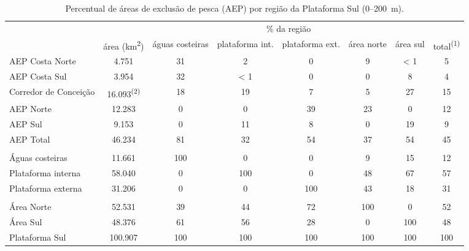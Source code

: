 \documentclass[a4paper,11pt,twoside,showtrims,onecolumn,openright,final]{memoir}
\begin{document}

\begin{table}
\caption{Percentual de áreas de exclusão de pesca (AEP) por região da Plataforma Sul (0--200~m).}
\label{tab:areas-aep}
\begin{tabularx}{\textheight}{Xccccccc}
\toprule
				&				& \multicolumn{5}{c}{\% da região} 						&	\\
\cmidrule(lr){3-7}
				& área (km\textsuperscript{2})	& águas costeiras & plataforma int.     & plataforma ext. 	& área norte	& área sul	& total\textsuperscript{(1)}	\\
\midrule
AEP Costa Norte			& 4.751				& 31		  &	2	       &	0		& 	9	& 	< 1	&  5	\\
AEP Costa Sul			& 3.954				& 32		  &	< 1	       &	0		& 	0	& 	8	&  4	\\
Corredor de Conceição		& 16.093\textsuperscript{(2)}	& 18		  &	19	       &	7		& 	5	& 	27	&  15	\\
AEP Norte 			& 12.283			& 0		  &	0	       &	39		& 	23	& 	0	&  12	\\
AEP Sul 			& 9.153				& 0		  &	11	       &	8		& 	0	& 	19	&  9	\\
\addlinespace
AEP Total			& 46.234			& 81		  &	32	       &	54		& 	37	& 	54	&  45	\\
\midrule
				&				&		  &		       &			&		&		&  	\\
Águas costeiras			& 11.661			& 100		  &	0	       &	0		& 	9	& 	15	&  12	\\
Plataforma interna		& 58.040			& 0		  &	100	       &	0		& 	48	& 	67	&  57	\\
Plataforma externa		& 31.206			& 0		  &	0	       &	100		& 	43	& 	18	&  31	\\
\midrule
				& 				& 		  &		       &			& 		& 		&  	\\
Área Norte			& 52.531			& 39		  &	44	       &	72		& 	100	& 	0	&  52	\\
Área Sul			& 48.376			& 61		  &	56	       &	28		& 	0	& 	100	&  48	\\
\addlinespace
Plataforma Sul			& 100.907			& 100		  &	100	       &	100		& 	100	& 	100	&  100	\\
\bottomrule
\end{tabularx}
\end{table}
\end{document}
